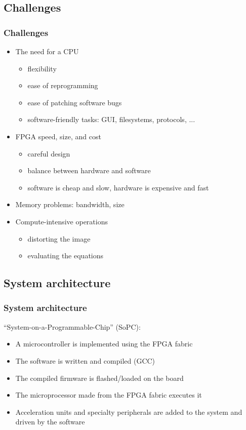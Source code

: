 \documentclass{beamer}
\begin{document}
\subsection{Challenges}
\frame
{
  \frametitle{Challenges}

  \begin{itemize}
  \item The need for a CPU
  \begin{itemize}
     \item flexibility
     \item ease of reprogramming
     \item ease of patching software bugs
     \item software-friendly tasks: GUI, filesystems, protocols, ...
  \end{itemize}
  \item FPGA speed, size, and cost
  \begin{itemize}
     \item careful design
     \item balance between hardware and software
     \item software is cheap and slow, hardware is expensive and fast
  \end{itemize}
  \item Memory problems: bandwidth, size
  \item Compute-intensive operations
  \begin{itemize}
     \item distorting the image
     \item evaluating the equations
  \end{itemize}
  \end{itemize}
}

\subsection{System architecture}
\frame
{
  \frametitle{System architecture}

  ``System-on-a-Programmable-Chip'' (SoPC):
  \begin{itemize}
  \item A microcontroller is implemented using the FPGA fabric
  \item The software is written and compiled (GCC)
  \item The compiled firmware is flashed/loaded on the board
  \item The microprocessor made from the FPGA fabric executes it
  \item Acceleration units and specialty peripherals are added to the system and driven by the software
  \end{itemize}
}
\end{document}
